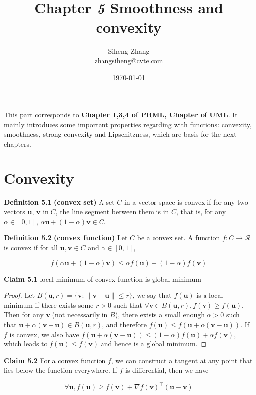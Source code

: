 \documentclass{article}
\author{Siheng Zhang\\zhangsiheng@cvte.com}
\title{Chapter \textbf{\textit{5}} Smoothness and convexity}
\date{\today}
\newtheorem*{proof}{Proof}
\begin{document}
\maketitle  

This part corresponds to \textbf{Chapter 1,3,4 of PRML, Chapter of UML}. It mainly introduces some important properties regarding with functions: convexity, smoothness, strong convexity and Lipschitzness, which are basis for the next chapters.

\tableofcontents
\newpage

\section{Convexity}

	\textbf{Definition 5.1 (convex set)} A set $C$ in a vector space is convex if for any two vectors $\mathbf{u}$, $\mathbf{v}$ in $C$, the line segment between them is in $C$, that is, for any $\alpha\in[0,1]$, $\alpha \mathbf{u} + (1-\alpha) \mathbf{v} \in C$.
	
	\textbf{Definition 5.2 (convex function)} Let $C$ be a convex set. A function $f: C\rightarrow \mathcal{R}$ is convex if for all $\mathbf{u}, \mathbf{v}\in C$ and $\alpha\in[0,1]$, 
	
	$$f(\alpha \mathbf{u} + (1-\alpha) \mathbf{v}) \leq \alpha f(\mathbf{u}) + (1-\alpha) f(\mathbf{v})$$
	
	\textbf{Claim 5.1} local minimum of convex function is global minimum
	\begin{proof}
	Let $B(\mathbf{u}, r)=\{\mathbf{v}: \|\mathbf{v}-\mathbf{u}\|\leq r\}$, we say that $f(\mathbf{u})$ is a local minimum if there exists some $r>0$ such that $\forall \mathbf{v} \in B(\mathbf{u}, r), f(\mathbf{v})\geq f(\mathbf{u})$. Then for any $\mathbf{v}$ (not necessarily in $B$), there exists a small enough $\alpha > 0$ such that $\mathbf{u}+\alpha(\mathbf{v}-\mathbf{u})\in B(\mathbf{u}, r)$, and therefore $f(\mathbf{u}) \leq f(\mathbf{u} + \alpha(\mathbf{v}-\mathbf{u}))$. If $f$ is convex, we also have $f(\mathbf{u} + \alpha(\mathbf{v}-\mathbf{u}))\leq (1-\alpha) f(\mathbf{u}) + \alpha f(\mathbf{v})$, which leads to $f(\mathbf{u})\leq f(\mathbf{v})$ and hence is a global minimum.
	\end{proof}
	
	\textbf{Claim 5.2} For a convex function $f$, we can construct a tangent at any point that lies below the function everywhere. If $f$ is differential, then we have 
	
	$$\forall \mathbf{u}, f(\mathbf{u})\geq f(\mathbf{v}) + \nabla f(\mathbf{v})^\top (\mathbf{u} - \mathbf{v})$$
\end{document}
